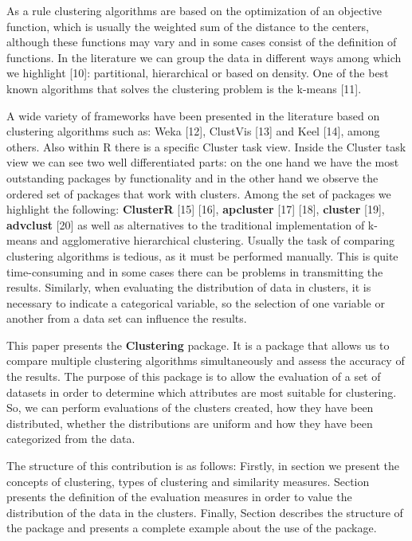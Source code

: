 \documentclass[
]{article}
\begin{document}
As a rule clustering algorithms are based on the optimization of an
objective function, which is usually the weighted sum of the distance to
the centers, although these functions may vary and in some cases consist
of the definition of functions. In the literature we can group the data
in different ways among which we highlight {[}10{]}: partitional,
hierarchical or based on density. One of the best known algorithms that
solves the clustering problem is the k-means {[}11{]}.

A wide variety of frameworks have been presented in the literature based
on clustering algorithms such as: Weka {[}12{]}, ClustVis {[}13{]} and
Keel {[}14{]}, among others. Also within R there is a specific Cluster
task view. Inside the Cluster task view we can see two well
differentiated parts: on the one hand we have the most outstanding
packages by functionality and in the other hand we observe the ordered
set of packages that work with clusters. Among the set of packages we
highlight the following: \textbf{ClusterR} {[}15{]} {[}16{]},
\textbf{apcluster} {[}17{]} {[}18{]}, \textbf{cluster} {[}19{]},
\textbf{advclust} {[}20{]} as well as alternatives to the traditional
implementation of k-means and agglomerative hierarchical clustering.
Usually the task of comparing clustering algorithms is tedious, as it
must be performed manually. This is quite time-consuming and in some
cases there can be problems in transmitting the results. Similarly, when
evaluating the distribution of data in clusters, it is necessary to
indicate a categorical variable, so the selection of one variable or
another from a data set can influence the results.

This paper presents the \textbf{Clustering} package. It is a package
that allows us to compare multiple clustering algorithms simultaneously
and assess the accuracy of the results. The purpose of this package is
to allow the evaluation of a set of datasets in order to determine which
attributes are most suitable for clustering. So, we can perform
evaluations of the clusters created, how they have been distributed,
whether the distributions are uniform and how they have been categorized
from the data.

The structure of this contribution is as follows: Firstly, in section
 we present the concepts of clustering, types of
clustering and similarity measures. Section 
presents the definition of the evaluation measures in order to value the
distribution of the data in the clusters. Finally, Section
 describes the structure of the package and
presents a complete example about the use of the package.
\end{document}
